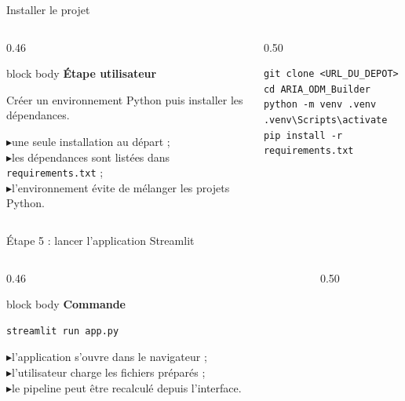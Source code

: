 \documentclass[10pt,aspectratio=169]{beamer}
\newcommand{\smallbullet}{\textcolor{MainBlue}{$\blacktriangleright$}\hspace{0.4em}}
\newenvironment{infobox}[1]
{\begin{beamercolorbox}[rounded=true,shadow=false,wd=\linewidth,sep=0.8em]{block body}
\textbf{\color{DarkBlue}#1}\par\vspace{0.3em}}
{\end{beamercolorbox}}
\begin{document}
\begin{frame}[fragile]{Installer le projet}
\begin{columns}[T,onlytextwidth]
\begin{column}{0.46\linewidth}
\begin{infobox}{Étape utilisateur}
Créer un environnement Python puis installer les dépendances.

\vspace{0.4em}
\smallbullet une seule installation au départ ;\\
\smallbullet les dépendances sont listées dans \texttt{requirements.txt} ;\\
\smallbullet l'environnement évite de mélanger les projets Python.
\end{infobox}
\end{column}

\begin{column}{0.50\linewidth}
\begin{lstlisting}
git clone <URL_DU_DEPOT>
cd ARIA_ODM_Builder
python -m venv .venv
.venv\Scripts\activate
pip install -r requirements.txt
\end{lstlisting}
\end{column}
\end{columns}
\end{frame}

\begin{frame}[fragile]{Étape 5 : lancer l'application Streamlit}
\begin{columns}[T,onlytextwidth]
\begin{column}{0.46\linewidth}
\begin{infobox}{Commande}
\begin{lstlisting}
streamlit run app.py
\end{lstlisting}

\smallbullet l'application s'ouvre dans le navigateur ;\\
\smallbullet l'utilisateur charge les fichiers préparés ;\\
\smallbullet le pipeline peut être recalculé depuis l'interface.
\end{infobox}
\end{column}

\begin{column}{0.50\linewidth}
\centering
{}
\end{column}
\end{columns}
\end{frame}
\end{document}
